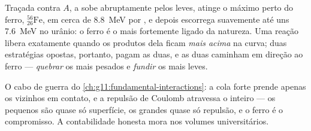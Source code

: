 \begin{proposition}\label{prop:g12:nuclear-energy:ironpeak}
Traçada contra $A$, a  sobe abruptamente pelos 
leves, atinge o máximo perto do ferro, ${}^{56}_{26}\mathrm{Fe}$, em cerca de
\qty{8.8}{MeV} por , e depois escorrega suavemente até uns \qty{7.6}{MeV} no
urânio: o ferro é o  mais fortemente ligado da natureza. Uma reação libera 
exatamente quando os produtos dela ficam \emph{mais acima} na curva; duas estratégias
opostas, portanto, pagam as duas, e as duas caminham em direção ao ferro ---
\emph{quebrar} os  mais pesados e \emph{fundir} os mais leves.
\end{proposition}
\admitted

\begin{remark}\label{rem:g12:nuclear-energy:whypeak}
O cabo de guerra do \cref{ch:g11:fundamental-interactions}: a cola forte prende apenas os
vizinhos em contato, e a repulsão de Coulomb atravessa o  inteiro --- os 
pequenos são quase só superfície, os grandes quase só repulsão, e o ferro é o
compromisso. A contabilidade honesta mora nos volumes universitários.
\end{remark}

